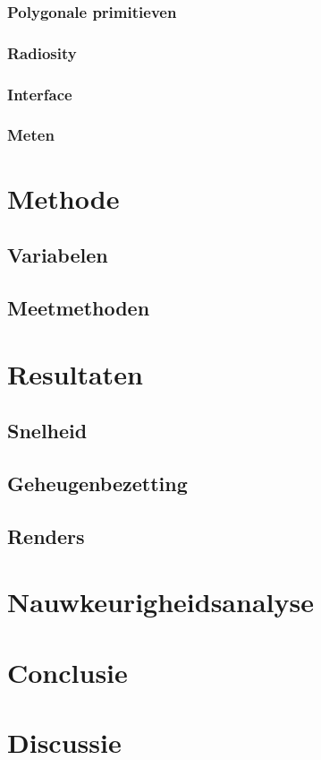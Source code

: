 \documentclass[12pt, a4paper]{article}
\begin{document}
\subsubsection{Polygonale primitieven}
\subsubsection{Radiosity}
\subsubsection{Interface}
\subsubsection{Meten}
\clearpage
\section{Methode}
\subsection{Variabelen}
\subsection{Meetmethoden}
\clearpage
\section{Resultaten}
\subsection{Snelheid}
\subsection{Geheugenbezetting}
\subsection{Renders}
\clearpage
\section{Nauwkeurigheidsanalyse}
\clearpage
\section{Conclusie}
\clearpage
\section{Discussie}
\clearpage
\end{document}
